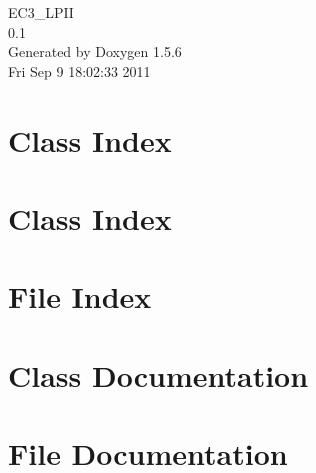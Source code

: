 \documentclass[a4paper]{book}
\begin{document}
\begin{titlepage}
\vspace*{7cm}
\begin{center}
{\Large EC3\_\-LPII \\[1ex]\large 0.1 }\\
\vspace*{1cm}
{\large Generated by Doxygen 1.5.6}\\
\vspace*{0.5cm}
{\small Fri Sep 9 18:02:33 2011}\\
\end{center}
\end{titlepage}
\clearemptydoublepage
{}
\tableofcontents
\clearemptydoublepage
{}
\chapter{Class Index}

\chapter{Class Index}

\chapter{File Index}

\chapter{Class Documentation}
















\chapter{File Documentation}









\printindex
\end{document}
